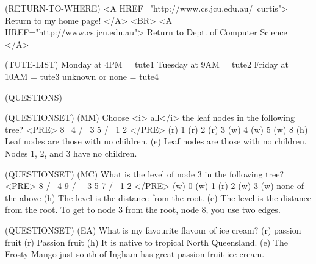 (RETURN-TO-WHERE) 
<A HREF="http://www.cs.jcu.edu.au/~curtis">
Return to my home page!
</A> <BR>
<A HREF="http://www.cs.jcu.edu.au">
Return to Dept. of Computer Science
</A>

(TUTE-LIST) 
Monday at 4PM = tute1
Tuesday at 9AM = tute2
Friday at 10AM = tute3
unknown or none = tute4

(QUESTIONS) 

(QUESTIONSET)
(MM) Choose <i> all</i> the leaf nodes in the following tree?
<PRE>
 8 
  \
   4
  / \
 3   5
    / \
   1   2
</PRE>
(r) 1
(r) 2
(r) 3
(w) 4
(w) 5
(w) 8
(h) Leaf nodes are those with no children.
(e) Leaf nodes are those with no children.
Nodes 1, 2, and 3 have no children.
 
(QUESTIONSET)
(MC) What is the level of node 3 in the following tree?
<PRE>
     8 
    / \
   4   9
  / \   \
 3   5   7
    / \
   1   2
</PRE>
(w) 0
(w) 1
(r) 2
(w) 3
(w) none of the above
(h) The level is the distance from the root.
(e) The level is the distance from the root.
To get to node 3 from the root, node 8, you use two edges.


(QUESTIONSET)
(EA) What is my favourite flavour of ice cream?
(r) passion fruit
(r) Passion fruit
(h) It is native to tropical North Queensland.
(e) The Frosty Mango just south of Ingham has great passion fruit 
ice cream.
